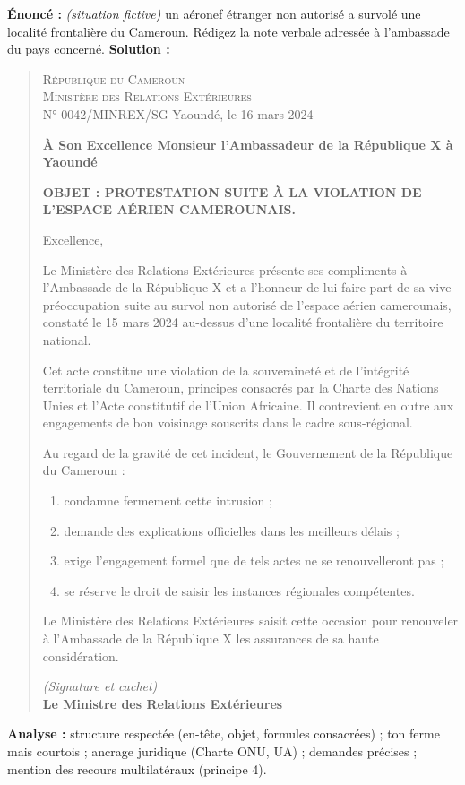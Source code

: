 \documentclass[11pt]{article}
\begin{document}
\begin{exoresolu}
\textbf{Énoncé :} \emph{(situation fictive)} un aéronef étranger non autorisé a survolé une localité frontalière du Cameroun. Rédigez la note verbale adressée à l'ambassade du pays concerné.
\tcblower
\textbf{Solution :}
\begin{quote}
\textsc{République du Cameroun}\\
\textsc{Ministère des Relations Extérieures}\\
N° 0042/MINREX/SG \hfill Yaoundé, le 16 mars 2024

\textbf{À Son Excellence Monsieur l'Ambassadeur de la République X à Yaoundé}

\textbf{OBJET : PROTESTATION SUITE À LA VIOLATION DE L'ESPACE AÉRIEN CAMEROUNAIS.}

Excellence,

Le Ministère des Relations Extérieures présente ses compliments à l'Ambassade de la République X et a l'honneur de lui faire part de sa vive préoccupation suite au survol non autorisé de l'espace aérien camerounais, constaté le 15 mars 2024 au-dessus d'une localité frontalière du territoire national.

Cet acte constitue une violation de la souveraineté et de l'intégrité territoriale du Cameroun, principes consacrés par la Charte des Nations Unies et l'Acte constitutif de l'Union Africaine. Il contrevient en outre aux engagements de bon voisinage souscrits dans le cadre sous-régional.

Au regard de la gravité de cet incident, le Gouvernement de la République du Cameroun :
\begin{enumerate}
    \item condamne fermement cette intrusion ;
    \item demande des explications officielles dans les meilleurs délais ;
    \item exige l'engagement formel que de tels actes ne se renouvelleront pas ;
    \item se réserve le droit de saisir les instances régionales compétentes.
\end{enumerate}

Le Ministère des Relations Extérieures saisit cette occasion pour renouveler à l'Ambassade de la République X les assurances de sa haute considération.

\textit{(Signature et cachet)}\\
\textbf{Le Ministre des Relations Extérieures}
\end{quote}
\textbf{Analyse :} structure respectée (en-tête, objet, formules consacrées) ; ton ferme mais courtois ; ancrage juridique (Charte ONU, UA) ; demandes précises ; mention des recours multilatéraux (principe 4).
\end{exoresolu}
\end{document}
